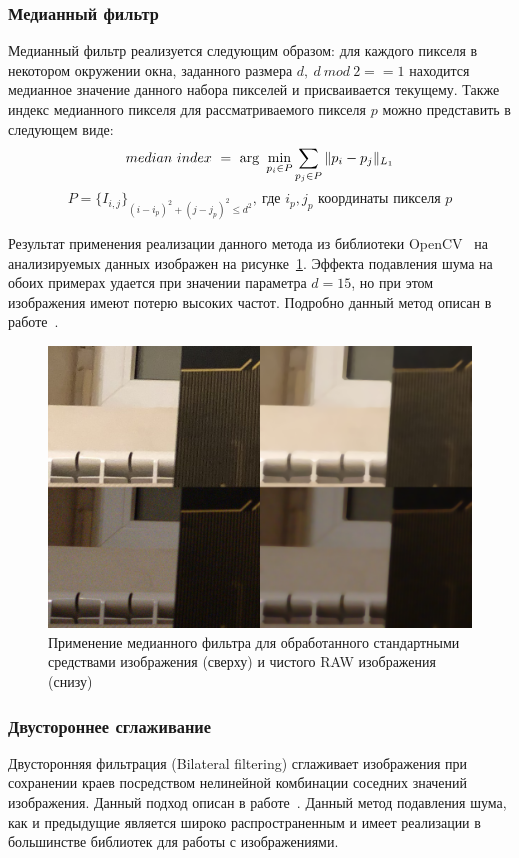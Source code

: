 \subsubsection{Медианный фильтр}

Медианный фильтр реализуется следующим образом: для каждого пикселя в некотором окружении окна, заданного размера $d,\ d\ mod\ 2 == 1$ находится медианное значение данного набора пикселей и присваивается текущему. Также индекс медианного пикселя для рассматриваемого пикселя $p$ можно представить в следующем виде:
\begin{equation}
median\ index\ =\ \arg\ \min_{p_i \in P} \sum_{p_j \in P} \Arrowvert p_i - p_j \Arrowvert_{L_1}
\end{equation}
$$P = \{I_{i, j}\}_ {(i - i_p)^2 + (j - j_p)^2 \le d^2},\ \text{где }i_p, j_p\text{ координаты пикселя }p$$

Результат применения реализации данного метода из библиотеки OpenCV~\autocite{OpenCVLib} на анализируемых данных изображен на рисунке~\ref{fig:medianblur_comparison}. Эффекта подавления шума на обоих примерах удается при значении параметра $d = 15$, но при этом изображения имеют потерю высоких частот. Подробно данный метод описан в работе~\autocite{MedianBluPaper}. 

\begin{figure}[h]
	\centering
	\includegraphics[width=\textwidth]{img/medianfilter_comparison}
	\caption{Применение медианного фильтра для обработанного стандартными средствами изображения (сверху) и чистого RAW изображения (снизу)}
	\label{fig:medianblur_comparison}
\end{figure}

\subsubsection{Двустороннее сглаживание}
Двусторонняя фильтрация (Bilateral filtering) сглаживает изображения при сохранении краев посредством нелинейной комбинации соседних значений изображения. Данный подход описан в работе~\autocite{BilateralPaper}. Данный метод подавления шума, как и предыдущие является широко распространенным и имеет реализации в большинстве библиотек для работы с изображениями. 

